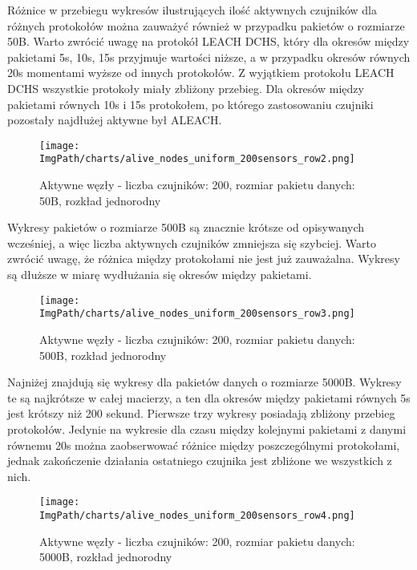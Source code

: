 Różnice w przebiegu wykresów ilustrujących ilość aktywnych czujników dla różnych protokołów można zauważyć również w przypadku pakietów o rozmiarze 50B. Warto zwrócić uwagę na protokół LEACH DCHS, który dla okresów między pakietami 5s, 10s, 15s przyjmuje wartości niższe, a w przypadku okresów równych 20s momentami wyższe od innych protokołów.  Z wyjątkiem protokołu LEACH DCHS wszystkie protokoły miały zbliżony przebieg. Dla okresów między pakietami równych 10s i 15s protokołem, po którego zastosowaniu czujniki pozostały najdłużej aktywne był ALEACH.

\begin{figure}[H]
	\begin{center}
		\texttt{[image: \\ImgPath/charts/alive\_nodes\_uniform\_200sensors\_row2.png]}
	\end{center}
	\caption{Aktywne węzły - liczba czujników: 200, rozmiar pakietu danych: 50B, rozkład jednorodny}
\end{figure}

Wykresy pakietów o rozmiarze 500B są znacznie krótsze od opisywanych wcześniej, a więc liczba aktywnych czujników zmniejsza się szybciej. Warto zwrócić uwagę, że różnica między protokołami nie jest już zauważalna. Wykresy są dłuższe w miarę wydłużania się okresów między pakietami.

\begin{figure}[H]
	\begin{center}
		\texttt{[image: \\ImgPath/charts/alive\_nodes\_uniform\_200sensors\_row3.png]}
	\end{center}
	\caption{Aktywne węzły - liczba czujników: 200, rozmiar pakietu danych: 500B, rozkład jednorodny}
\end{figure}

Najniżej znajdują się wykresy dla pakietów danych o rozmiarze 5000B. Wykresy te są najkrótsze w całej macierzy, a ten dla okresów między pakietami równych 5s jest krótszy niż 200 sekund. Pierwsze trzy wykresy posiadają zbliżony przebieg protokołów. Jedynie na wykresie dla czasu między kolejnymi pakietami z danymi równemu 20s można zaobserwować różnice między poszczególnymi protokołami, jednak zakończenie działania ostatniego czujnika jest zbliżone we wszystkich z nich.

\begin{figure}[H]
	\begin{center}
		\texttt{[image: \\ImgPath/charts/alive\_nodes\_uniform\_200sensors\_row4.png]}
	\end{center}
	\caption{Aktywne węzły - liczba czujników: 200, rozmiar pakietu danych: 5000B, rozkład jednorodny}
\end{figure}


